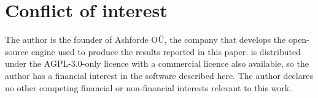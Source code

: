 \section*{Conflict of interest}

The author is the founder of Ashforde O\"U, the company that develops the
open-source  engine used to produce the results reported in this
paper.  is distributed under the AGPL-3.0-only licence with a
commercial licence also available, so the author has a financial interest in the
software described here. The author declares no other competing financial or
non-financial interests relevant to this work.
